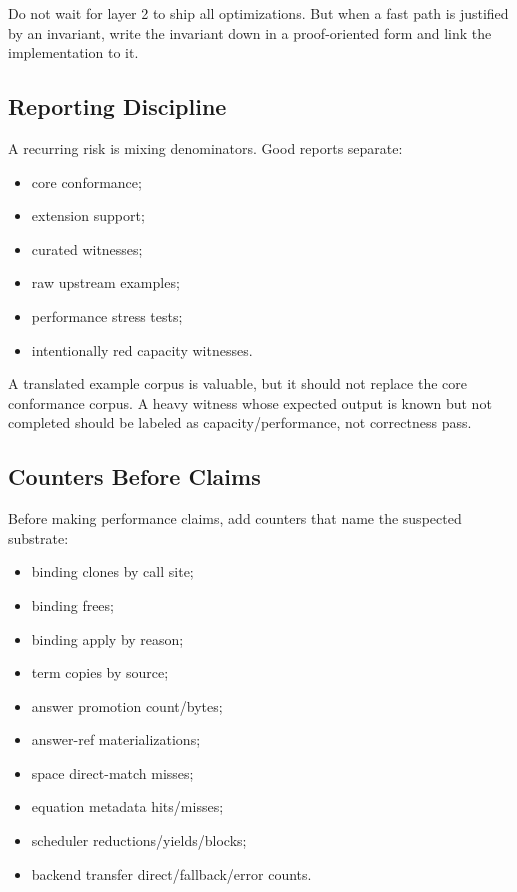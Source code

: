 \documentclass[11pt]{article}
\begin{document}
Do not wait for layer 2 to ship all optimizations.  But when a fast path is justified by an invariant, write the invariant down in a proof-oriented form and link the implementation to it.

\subsection{Reporting Discipline}

A recurring risk is mixing denominators.  Good reports separate:

\begin{itemize}[leftmargin=*]
  \item core conformance;
  \item extension support;
  \item curated witnesses;
  \item raw upstream examples;
  \item performance stress tests;
  \item intentionally red capacity witnesses.
\end{itemize}

A translated example corpus is valuable, but it should not replace the core conformance corpus.  A heavy witness whose expected output is known but not completed should be labeled as capacity/performance, not correctness pass.

\subsection{Counters Before Claims}

Before making performance claims, add counters that name the suspected substrate:

\begin{itemize}[leftmargin=*]
  \item binding clones by call site;
  \item binding frees;
  \item binding apply by reason;
  \item term copies by source;
  \item answer promotion count/bytes;
  \item answer-ref materializations;
  \item space direct-match misses;
  \item equation metadata hits/misses;
  \item scheduler reductions/yields/blocks;
  \item backend transfer direct/fallback/error counts.
\end{itemize}
\end{document}
